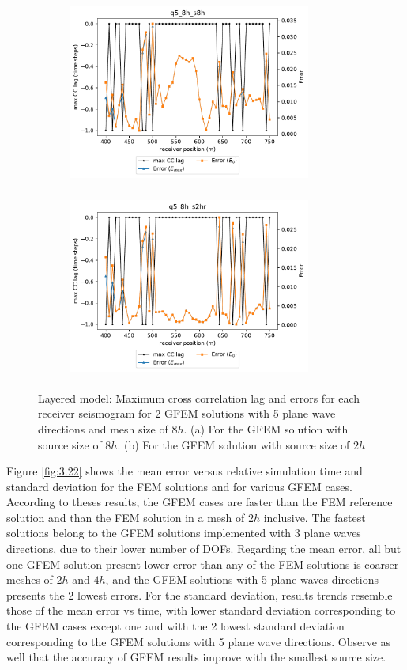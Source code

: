  \begin{figure}[h!]
 		\centering
		\begin{subfigure}{8cm}
				\includegraphics[width=8cm, height=6cm]{Thesis_Edith/figures/layered_model/layer_waves/Err_q5_8h_s8h.pdf}
			     \caption{}
		\end{subfigure}
        \hspace{0.25cm}	
		\begin{subfigure}{8cm}
				\includegraphics[width=8cm, height=6cm]{Thesis_Edith/figures/layered_model/layer_waves/Err_q5_8h_s2hr.pdf}
			   \caption{}
		\end{subfigure}
 
	\caption{Layered model: Maximum cross correlation lag and errors for each receiver seismogram for 2 GFEM solutions with 5 plane wave directions and mesh size of $8h$. (a) For the GFEM solution with source size of $8h$. (b) For the GFEM solution with source size of $2h$}
	\label{fig:3.21}
\end{figure}

Figure \ref{fig:3.22} shows the mean error versus relative simulation time and standard deviation for the FEM solutions and for various GFEM cases. According to theses results, the GFEM cases are faster than the FEM reference solution and than the FEM solution in a mesh of $2h$ inclusive. The fastest solutions belong to the GFEM solutions implemented with 3 plane waves directions, due to their lower number of DOFs.
Regarding the mean error, all but one GFEM solution present lower error than any of the FEM solutions is coarser meshes of $2h$ and $4h$, and the GFEM solutions with 5 plane waves directions presents the 2 lowest errors. 
For the standard deviation, results trends resemble those of the mean error vs time, with lower standard deviation corresponding to the GFEM cases except one and with the 2 lowest standard deviation corresponding to the GFEM solutions with 5 plane wave directions. Observe as well that the accuracy of GFEM results improve with the smallest source size. 


